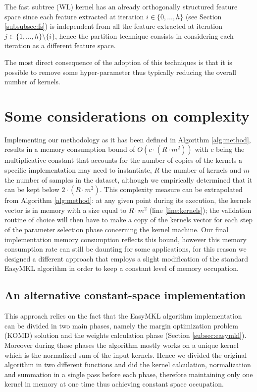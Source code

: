 The fast subtree (WL) kernel has an already orthogonally structured feature
space since each feature extracted at iteration $i \in \{0,\dots,h\}$ (see Section \ref{subsubsec:fs})
is independent from all the feature extracted at iteration $j \in \{1,\dots,h\}\setminus \{i\}$,
hence the partition technique consists in considering each iteration as a different
feature space.

The most direct consequence of the adoption of this techniques is that it is
possible to remove some hyper-parameter thus typically reducing the
overall number of kernels.


\section{Some considerations on complexity}

Implementing our methodology as it has been defined in Algorithm \ref{alg:method},
results in a memory consumption bound of $O(c \cdot (R\cdot m^2))$ with $c$ being
the multiplicative constant that accounts for the number of copies of the kernels
a specific implementation may need to instantiate, $R$ the number of kernels and
$m$ the number of samples in the dataset, although we empirically determined that
it can be kept below $2\cdot (R\cdot m^2)$.
This complexity measure can be extrapolated from  Algorithm \ref{alg:method}:
at any given point during its execution, the kernels vector is in
memory with a size equal to $R\cdot m^2$ (line \ref{line:kernels});
the validation routine of choice will then have to make a copy of the kernels vector
for each step of the parameter selection phase concerning the kernel machine.
Our final implementation memory consumption reflects this bound, however this
memory consumption rate can still be daunting for some applications,
for this reason we designed a different approach that employs a slight modification
of the standard EasyMKL algorithm \cite{aiolli2015easymkl} in order to keep a
constant level of memory occupation.

\subsection{An alternative constant-space implementation}
\label{subsec:opt}
This approach relies on the fact that the EasyMKL algorithm implementation can
be divided in two main phases, namely the margin optimization problem (KOMD)
solution and the weights calculation phase (Section \ref{subsec:easymkl}).
Moreover during these phases the algorithm mostly works on a unique kernel which is
the normalized sum of the input kernels.
Hence we divided the original algorithm in two different functions and did
the kernel calculation, normalization and summation in a single pass before each phase,
therefore maintaining only one kernel in memory at one time thus achieving constant
space occupation.

